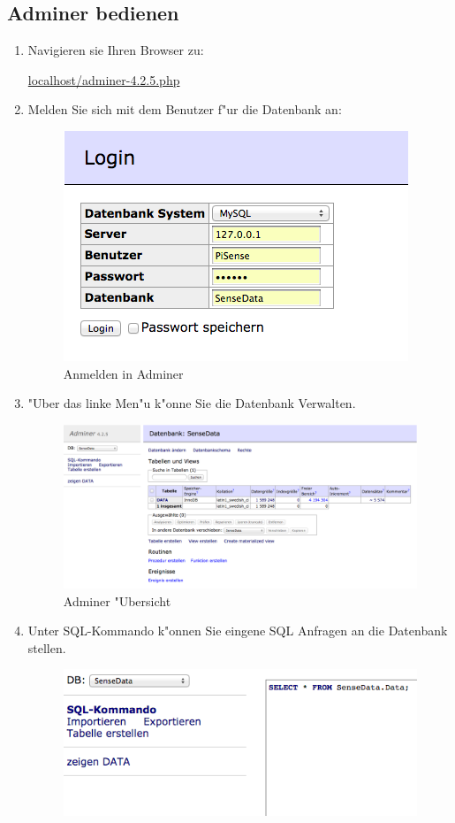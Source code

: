 \documentclass[oneside, a4paper, 11pt]{report}
\begin{document}
			\subsection{Adminer bedienen}
				\begin{enumerate}
					\item
						Navigieren sie Ihren Browser zu:
						\begin{center}
							\url{localhost/adminer-4.2.5.php}
						\end{center}
					\item 
						Melden Sie sich mit dem Benutzer f"ur die Datenbank an:
						\begin{figure}[h!]
							\centering
							\includegraphics[width=0.55\linewidth]{img/login.png}
							\caption{Anmelden in Adminer\label{login}}
						\end{figure}
					\newpage
					\item
						"Uber das linke Men"u k"onne Sie die Datenbank Verwalten.
						\begin{figure}[h!]
							\centering
							\includegraphics[width=0.9\linewidth]{img/adminer.png}
							\caption{Adminer "Ubersicht\label{ubers}}
						\end{figure}
					\item
						Unter SQL-Kommando k"onnen Sie eingene SQL Anfragen an die Datenbank stellen.
						\begin{figure}[h!]
							\centering
							\includegraphics[width=0.55\linewidth]{img/sql.png}

\end{figure}
\end{enumerate}
\end{document}
